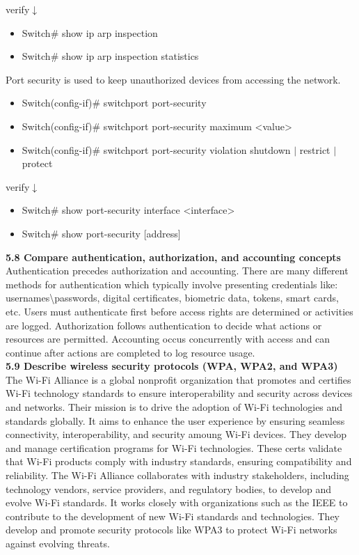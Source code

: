\documentclass{article}
\begin{document}
verify$\downarrow$
\begin{itemize}
\item Switch\# show ip arp inspection
\item Switch\# show ip arp inspection statistics
\end{itemize}
		
Port security is used to keep unauthorized devices from accessing the network.
\begin{itemize}
\item Switch(config-if)\# switchport port-security
\item Switch(config-if)\# switchport port-security maximum \textless value\textgreater
\item Switch(config-if)\# switchport port-security violation {shutdown $\mid$ restrict $\mid$ protect}
\end{itemize}

verify$\downarrow$
\begin{itemize}
\item Switch\# show port-security interface \textless interface\textgreater
\item Switch\# show port-security [address]
\end{itemize}
  
\noindent\textbf{5.8 Compare authentication, authorization, and accounting concepts}\\

	Authentication precedes authorization and accounting. There are many different methods for authentication which typically involve presenting credentials like: usernames\textbackslash{}passwords, digital certificates, biometric data, tokens, smart cards, etc. Users must authenticate first before access rights are determined or activities are logged. Authorization follows authentication to decide what actions or resources are permitted. Accounting occus concurrently with access and can continue after actions are completed to log resource usage.\\
  
\noindent\textbf{5.9 Describe wireless security protocols (WPA, WPA2, and WPA3)}\\
	
	The Wi-Fi Alliance is a global nonprofit organization that promotes and certifies Wi-Fi technology standards to ensure interoperability and security across devices and networks. Their mission is to drive the adoption of Wi-Fi technologies and standards globally. It aims to enhance the user experience by ensuring seamless connectivity, interoperability, and security amoung Wi-Fi devices. They develop and manage certification programs for Wi-Fi technologies. These certs validate that Wi-Fi products comply with industry standards, ensuring compatibility and reliability. The Wi-Fi Alliance collaborates with industry stakeholders, including technology vendors, service providers, and regulatory bodies, to develop and evolve Wi-Fi standards. It works closely with organizations such as the IEEE to contribute to the development of new Wi-Fi standards and technologies. They develop and promote security protocols like WPA3 to protect Wi-Fi networks against evolving threats.\\
\end{document}
